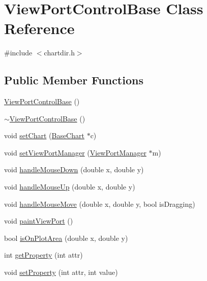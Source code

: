 \hypertarget{class_view_port_control_base}{}\section{View\+Port\+Control\+Base Class Reference}
\label{class_view_port_control_base}


{\ttfamily \#include $<$chartdir.\+h$>$}

\subsection*{Public Member Functions}
\begin{DoxyCompactItemize}
\item 
\hyperlink{class_view_port_control_base_a2fed0f0fe399b69400bf1b6f90aa62e4}{View\+Port\+Control\+Base} ()
\item 
\hyperlink{class_view_port_control_base_aec61d9470aafef379ced9e889a22069f}{$\sim$\+View\+Port\+Control\+Base} ()
\item 
void \hyperlink{class_view_port_control_base_ad7a5179527304cf00c13d88ac9d3c1c5}{set\+Chart} (\hyperlink{class_base_chart}{Base\+Chart} $\ast$c)
\item 
void \hyperlink{class_view_port_control_base_ae4fd71d263b62c293a8dd70afa917f26}{set\+View\+Port\+Manager} (\hyperlink{class_view_port_manager}{View\+Port\+Manager} $\ast$m)
\item 
void \hyperlink{class_view_port_control_base_a7774f9a3b5f0197ea9f4cb91caf83a52}{handle\+Mouse\+Down} (double x, double y)
\item 
void \hyperlink{class_view_port_control_base_ac66da55984813513cf33f3b1b608bd9a}{handle\+Mouse\+Up} (double x, double y)
\item 
void \hyperlink{class_view_port_control_base_ab7bf3d47eb60524b9ba3a4506ebc9345}{handle\+Mouse\+Move} (double x, double y, bool is\+Dragging)
\item 
void \hyperlink{class_view_port_control_base_a10a3a107e2c2c3328ab1529de734d3fb}{paint\+View\+Port} ()
\item 
bool \hyperlink{class_view_port_control_base_affc7aa4c21872bb06c51665c3a65e565}{is\+On\+Plot\+Area} (double x, double y)
\item 
int \hyperlink{class_view_port_control_base_adbb7131d58df8d9f3e592f1ec082edf7}{get\+Property} (int attr)
\item 
void \hyperlink{class_view_port_control_base_ad986d665159e9e2000958ef356a253b4}{set\+Property} (int attr, int value)

\end{DoxyCompactItemize}
